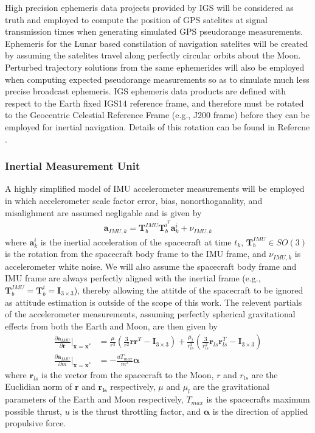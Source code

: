 \documentclass[letterpaper, submit]{AAS}			%
\begin{document}
High precision ephemeris data projects provided by IGS \cite{IGSproducts} will be considered as truth and employed to compute the position of GPS satelites at signal transmission times when generating simulated GPS pseudorange measurements. Ephemeris for the Lunar based constilation of navigation satelites will be created by assuming the satelites travel along perfectly circular orbits about the Moon. Perturbed trajectory solutions from the same ephemerides will also be employed when computing expected pseudorange measurements so as to simulate much less precise broadcast ephemeris. IGS ephemeris data products are defined with respect to the Earth fixed IGS14 reference frame, and therefore must be rotated to the Geocentric Celestial Reference Frame (e.g., J200 frame) before they can be employed for inertial navigation. Details of this rotation can be found in Refercne .

\subsubsection{Inertial Measurement Unit}
A highly simplified model of IMU accelerometer measurements will be employed in which accelerometer scale factor error, bias, nonorthoganality, and misalighment are assumed negligable and is given by
\begin{align}
	\mathbf{a}_{IMU,k} = \mathbf{T}_b^{IMU}\mathbf{T}_b^{i^T}\mathbf{a}_k^i + \nu_{IMU,k}
\end{align}
where $\mathbf{a}_k^i$ is the inertial acceleration of the spacecraft at time $t_k$, $\mathbf{T}_b^{IMU}\in SO(3)$ is the rotation from the spacecraft body frame to the IMU frame, and $\nu_{IMU,k}$ is accelerometer white noise. We will also assume the spacecraft body frame and IMU frame are always perfectly aligned with the inertial frame (e.g., $\mathbf{T}_b^{IMU} = \mathbf{T}_b^i = \mathbf{I}_{3\times3}$), thereby allowing the attitde of the spacecraft to be ignored as attitude estimation is outside of the scope of this work. The relevent partials of the accelerometer measurements, assuming perfectly spherical gravitational effects from both the Earth and Moon, are then given by
\begin{align}
	\frac{\partial \mathbf{a}_{IMU}}{\partial \mathbf{r}}\bigg|_{\mathbf{x}=\mathbf{x}^*} &= \frac{\mu}{r^3}\left(\frac{3}{r^2}\mathbf{r}\mathbf{r}^T - \mathbf{I}_{3\times3}\right) + \frac{\mu_l}{r_{ls}^3}\left(\frac{3}{r_{ls}^2}\mathbf{r}_{ls}\mathbf{r}_{ls}^T - \mathbf{I}_{3\times3}\right) \\
	\frac{\partial \mathbf{a}_{IMU}}{\partial m}\bigg|_{\mathbf{x}=\mathbf{x}^*} &= -\frac{u T_{max}}{m^2}\boldsymbol{\alpha}
\end{align}
where $\mathbf{r}_{ls}$ is the vector from the spacecraft to the Moon, $r$ and $r_{ls}$ are the Euclidian norm of $\mathbf{r}$ and $\mathbf{r_{ls}}$ respectively, $\mu$ and $\mu_l$ are the gravitational parameters of the Earth and Moon respectively, $T_{max}$ is the spacecrafts maximum possible thrust, $u$ is the thrust throttling factor, and $\boldsymbol{\alpha}$ is the direction of applied propulsive force.
\end{document}
